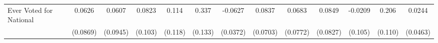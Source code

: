 {\begin{tabular}{l*{12}{c}}
\addlinespace
Ever Voted for National&      0.0626         &      0.0607         &      0.0823         &       0.114         &       0.337\sym{*}  &     -0.0627         &      0.0837         &      0.0683         &      0.0849         &     -0.0209         &       0.206         &      0.0244         \\
            &    (0.0869)         &    (0.0945)         &     (0.103)         &     (0.118)         &     (0.133)         &    (0.0372)         &    (0.0703)         &    (0.0772)         &    (0.0827)         &     (0.105)         &     (0.110)         &    (0.0463)         \\
\bottomrule
\end{tabular}
}
